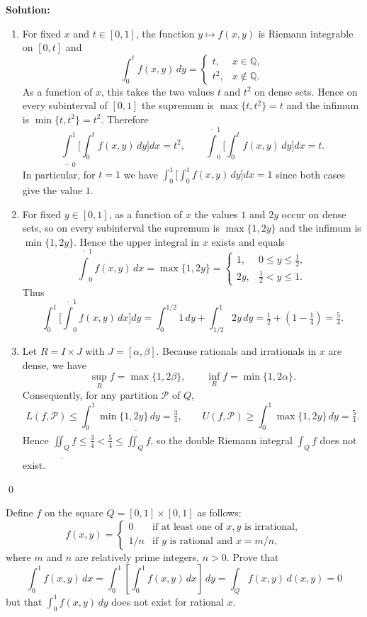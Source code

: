 \noindent\textbf{Solution:}
\begin{enumerate}[label=(\alph*)]
\item For fixed $x$ and $t\in[0,1]$, the function $y\mapsto f(x,y)$ is Riemann integrable on $[0,t]$ and
\[\int_0^t f(x,y)\,dy = \begin{cases} t, & x\in\mathbb Q, \\[4pt] t^2, & x\notin\mathbb Q.\end{cases}\]
As a function of $x$, this takes the two values $t$ and $t^2$ on dense sets. Hence on every subinterval of $[0,1]$ the supremum is $\max\{t,t^2\}=t$ and the infimum is $\min\{t,t^2\}=t^2$. Therefore
\[ \underline\int_0^1\!\Big[\int_0^t f(x,y)\,dy\Big]dx = t^2,\qquad \overline\int_0^1\!\Big[\int_0^t f(x,y)\,dy\Big]dx = t. \]
In particular, for $t=1$ we have $\int_0^1\!\big[\int_0^1 f(x,y)\,dy\big]dx=1$ since both cases give the value $1$.

\item For fixed $y\in[0,1]$, as a function of $x$ the values $1$ and $2y$ occur on dense sets, so on every subinterval the supremum is $\max\{1,2y\}$ and the infimum is $\min\{1,2y\}$. Hence the upper integral in $x$ exists and equals
\[ \overline\int_0^1 f(x,y)\,dx = \max\{1,2y\} = \begin{cases} 1, & 0\le y\le \tfrac12, \\[4pt] 2y, & \tfrac12< y\le 1. \end{cases} \]
Thus
\[ \int_0^1\!\Big[\overline\int_0^1 f(x,y)\,dx\Big]dy = \int_0^{1/2}\!1\,dy + \int_{1/2}^1\!2y\,dy = \tfrac12 + (1-\tfrac14) = \tfrac{5}{4}. \]

\item Let $R=I\times J$ with $J=[\alpha,\beta]$. Because rationals and irrationals in $x$ are dense, we have
\[ \sup_R f = \max\{1,2\beta\},\qquad \inf_R f=\min\{1,2\alpha\}. \]
Consequently, for any partition $\mathcal P$ of $Q$,
\[ L(f,\mathcal P) \le \int_0^1 \min\{1,2y\}\,dy = \tfrac{3}{4},\qquad U(f,\mathcal P) \ge \int_0^1 \max\{1,2y\}\,dy = \tfrac{5}{4}. \]
Hence $\underline{\iint_Q} f \le \tfrac34 < \tfrac54 \le \overline{\iint_Q} f$, so the double Riemann integral $\int_Q f$ does not exist.
\end{enumerate}\qed


\begin{problembox}
Define \( f \) on the square \( Q = [0, 1] \times [0, 1] \) as follows:
\[f(x, y) = 
\begin{cases} 
0 & \text{if at least one of } x, y \text{ is irrational}, \\ 
1/n & \text{if } y \text{ is rational and } x = m/n,
\end{cases}\]
where \( m \) and \( n \) are relatively prime integers, \( n > 0 \). Prove that
\[\int_{0}^{1} f(x, y) \, dx = \int_{0}^{1} \left[ \int_{0}^{1} f(x, y) \, dx \right] \, dy = \int_{Q} f(x, y) \, d(x, y) = 0\]
but that \( \int_{0}^{1} f(x, y) \, dy \) does not exist for rational \( x \).
\end{problembox}


